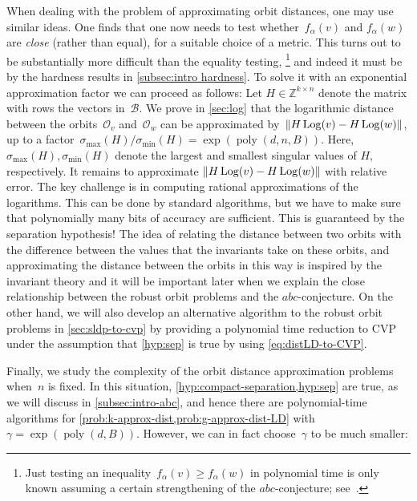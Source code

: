 \documentclass[10pt,a4paper]{article}
\theoremstyle{definition}
\DeclareMathOperator{\poly}{poly}
\DeclareMathOperator{\Log}{Log}
\newcommand{\ZZ}{\mathbb{Z}}
\newcommand{\OO}{\ensuremath{\mathcal{O}}}
\newcommand{\NP}{\ensuremath{\mathsf{NP}}\xspace}
\newcommand{\abc}{\texorpdfstring{$abc$}{abc}}
\DeclarePairedDelimiter\abs{\lvert}{\rvert}
\DeclarePairedDelimiter\norm{\lVert}{\rVert}
\numberwithin{equation}{section}
\begin{document}
When dealing with the problem of approximating orbit distances, one may use similar ideas.
One finds that one now needs to test whether~$f_\alpha(v)$
and $f_\alpha(w)$ are \emph{close} (rather than equal),
for a suitable choice of a metric.
This turns out to be substantially more difficult than the equality testing,%
\footnote{Just testing an inequality~$f_\alpha(v) \ge f_\alpha(w)$ in polynomial time is only known assuming a certain strengthening of the \abc-conjecture; see~\cite{mono-testing-abc}.}
and indeed it must be by the hardness results in \cref{subsec:intro hardness}.
To solve it with an exponential approximation factor we can proceed as follows:
Let $H\in\ZZ^{k\times n}$ denote the matrix with rows the vectors in~$\mathcal B$.
We prove in \cref{sec:log} that the logarithmic distance between the orbits~$\OO_v$ and~$\OO_w$
can be approximated by~$\norm{H \Log(v) - H \Log(w)}$,
up to a factor~$\sigma_{\max}(H)/\sigma_{\min}(H) = \exp(\poly(d,n,B))$.
Here, $\sigma_{\max}(H),\sigma_{\min}(H)$ denote the largest and smallest singular values of $H$, respectively.
It remains to approximate $\norm{H \Log(v) - H \Log(w)}$ with relative error.
The key challenge is in computing rational approximations of the logarithms.
This can be done by standard algorithms, but we have to make sure
that polynomially many bits of accuracy are sufficient.
This is guaranteed by the separation hypothesis!
The idea of relating the distance between two orbits with the difference
between the values that the invariants take on these orbits,
and approximating the distance between the orbits in this way is inspired by the invariant theory
and it will be important later
when we explain the close relationship between the robust orbit problems and the \abc-conjecture.
On the other hand,
we will also develop an alternative algorithm to the robust orbit problems in \cref{sec:sldp-to-cvp}
by providing a polynomial time reduction to CVP under the assumption that \cref{hyp:sep} is true
by using \cref{eq:distLD-to-CVP}.


Finally, we study the complexity of the orbit distance approximation problems when~$n$ is fixed.
In this situation, \cref{hyp:compact-separation,hyp:sep} are true,
as we will discuss in \cref{subsec:intro-abc},
and hence there are polynomial-time algorithms for \cref{prob:k-approx-dist,prob:g-approx-dist-LD}
with $\gamma=\exp(\poly(d,B))$.
However, we can in fact choose~$\gamma$ to be much smaller:
\end{document}
